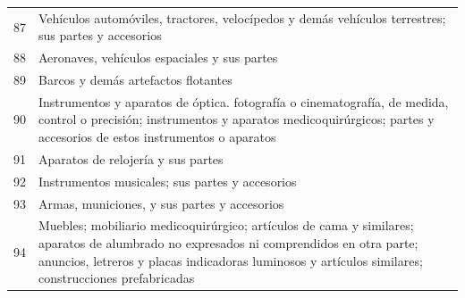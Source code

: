 \documentclass[a4paper,openright,12pt]{book}
\begin{document}
\begin{table}[]
{\begin{tabular}{@{}ll@{}}
    87  & Vehículos automóviles, tractores, velocípedos y demás vehículos terrestres; sus partes y accesorios                                                                                                                                                                                            \\
    88  & Aeronaves, vehículos espaciales y sus partes                                                                                                                                                                                                                                                   \\
    89  & Barcos y demás artefactos flotantes                                                                                                                                                                                                                                                            \\
    90  & Instrumentos y aparatos de óptica. fotografía o cinematografía, de medida, control o precisión; instrumentos y aparatos medicoquirúrgicos; partes y accesorios de estos instrumentos o aparatos                                                                                                \\
    91  & Aparatos de relojería y sus partes                                                                                                                                                                                                                                                             \\
    92  & Instrumentos musicales; sus partes y accesorios                                                                                                                                                                                                                                                \\
    93  & Armas, municiones, y sus partes y accesorios                                                                                                                                                                                                                                                   \\
    94  & Muebles; mobiliario medicoquirúrgico; artículos de cama y similares; aparatos de alumbrado no expresados ni comprendidos en otra parte; anuncios, letreros y placas indicadoras luminosos y artículos similares; construcciones prefabricadas                                                  \\

\end{tabular}}
\end{table}
\end{document}
